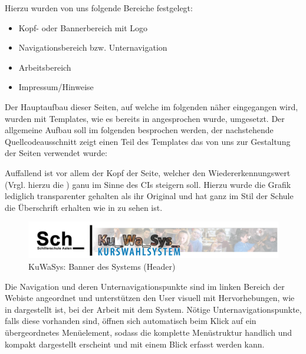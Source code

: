 Hierzu wurden von uns folgende Bereiche festgelegt:
\begin{itemize}
  \item Kopf- oder Bannerbereich mit Logo
  \item Navigationsbereich bzw. Unternavigation
  \item Arbeitsbereich
  \item Impressum/Hinweise
\end{itemize}

Der Hauptaufbau dieser Seiten, auf welche im folgenden näher eingegangen wird, wurden mit Templates, wie es bereits in  angesprochen wurde, umgesetzt.
Der allgemeine Aufbau soll im folgenden besprochen werden, der nachstehende Quellcodeausschnitt zeigt einen Teil des Templates das von uns zur Gestaltung der Seiten verwendet wurde:


Auffallend ist vor allem der Kopf der Seite, welcher den Wiedererkennungswert (Vrgl. hierzu die ) ganu im Sinne des \ac{CI}s steigern soll.
Hierzu wurde die Grafik lediglich transparenter gehalten als ihr Original und hat ganz im Stil der Schule die Überschrift erhalten wie in  zu sehen ist.

\begin{figure}[H]
 \begin{center}
   \includegraphics[scale=0.4]{img/header_KuWaSys.png}
 \end{center}
 \caption[\textbf{KuWaSys: Banner des Systems (Header)}]{KuWaSys: Banner des Systems (Header)}
 \label{fig:header_KuWaSys}
\end{figure}

Die Navigation und deren Unternavigationspunkte sind im linken Bereich der Webiste angeordnet und unterstützen den User visuell mit Hervorhebungen, wie in  dargestellt ist, bei der Arbeit mit dem System.
Nötige Unternavigationspunkte, falls diese vorhanden sind, öffnen sich automatisch beim Klick auf ein übergeordnetes Menüelement, sodass die komplette Menüstruktur handlich und kompakt dargestellt erscheint und mit einem Blick erfasst werden kann.

